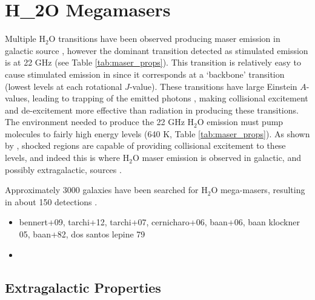 \section{H_2O Megamasers}
\label{sec:h2o_mm}

Multiple H$_2$O transitions have been observed producing maser emission in galactic source \citep{Elitzur_1992}, however the dominant transition detected as stimulated emission is at 22 GHz (see Table \ref{tab:maser_props}). This transition is relatively easy to cause stimulated emission in since it corresponds at a `backbone' transition (lowest levels at each rotational $J$-value). These transitions have large Einstein $A$-values, leading to trapping of the emitted photons \citep{stahler_palla_2004}, making collisional excitement and de-excitement more effective than radiation in producing these transitions. The environment needed to produce the 22 GHz H$_2$O emission must pump molecules to fairly high energy levels (640 K, Table \ref{tab:maser_props}). As shown by \citet{stahler_palla_2004}, shocked regions are capable of providing collisional excitement to these levels, and indeed this is where H$_2$O maser emission is observed in galactic, and possibly extragalactic, sources \citep{Elitzur_1992, lo2005}. 


Approximately 3000 galaxies have been searched for H$_2$O mega-masers, resulting in about 150 detections \citep[][based on compiled information from the Megamaser Cosmology Project, \S\ref{sub:h2o_cosmo}]{tarchi2012}. 

\begin{itemize}
\item bennert+09, tarchi+12, tarchi+07, cernicharo+06, baan+06, baan klockner 05, baan+82, dos santos lepine 79
\item 
\end{itemize}

\subsection{Extragalactic Properties}
\label{sub:h2o_props}

